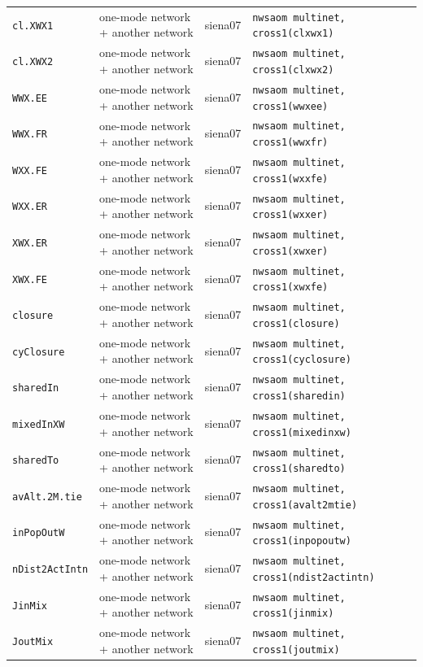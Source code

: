 \begin{longtable}{@{}p{2.6cm}p{3.2cm}p{2.9cm}p{5.4cm}@{}}
\texttt{cl.XWX1} & one-mode network + another network & siena07 & \texttt{nwsaom multinet, cross1(clxwx1)}\\
\texttt{cl.XWX2} & one-mode network + another network & siena07 & \texttt{nwsaom multinet, cross1(clxwx2)}\\
\texttt{WWX.EE} & one-mode network + another network & siena07 & \texttt{nwsaom multinet, cross1(wwxee)}\\
\texttt{WWX.FR} & one-mode network + another network & siena07 & \texttt{nwsaom multinet, cross1(wwxfr)}\\
\texttt{WXX.FE} & one-mode network + another network & siena07 & \texttt{nwsaom multinet, cross1(wxxfe)}\\
\texttt{WXX.ER} & one-mode network + another network & siena07 & \texttt{nwsaom multinet, cross1(wxxer)}\\
\texttt{XWX.ER} & one-mode network + another network & siena07 & \texttt{nwsaom multinet, cross1(xwxer)}\\
\texttt{XWX.FE} & one-mode network + another network & siena07 & \texttt{nwsaom multinet, cross1(xwxfe)}\\
\texttt{closure} & one-mode network + another network & siena07 & \texttt{nwsaom multinet, cross1(closure)}\\
\texttt{cyClosure} & one-mode network + another network & siena07 & \texttt{nwsaom multinet, cross1(cyclosure)}\\
\texttt{sharedIn} & one-mode network + another network & siena07 & \texttt{nwsaom multinet, cross1(sharedin)}\\
\texttt{mixedInXW} & one-mode network + another network & siena07 & \texttt{nwsaom multinet, cross1(mixedinxw)}\\
\texttt{sharedTo} & one-mode network + another network & siena07 & \texttt{nwsaom multinet, cross1(sharedto)}\\
\texttt{avAlt.2M.tie} & one-mode network + another network & siena07 & \texttt{nwsaom multinet, cross1(avalt2mtie)}\\
\texttt{inPopOutW} & one-mode network + another network & siena07 & \texttt{nwsaom multinet, cross1(inpopoutw)}\\
\texttt{nDist2ActIntn} & one-mode network + another network & siena07 & \texttt{nwsaom multinet, cross1(ndist2actintn)}\\
\texttt{JinMix} & one-mode network + another network & siena07 & \texttt{nwsaom multinet, cross1(jinmix)}\\
\texttt{JoutMix} & one-mode network + another network & siena07 & \texttt{nwsaom multinet, cross1(joutmix)}\\

\end{longtable}
